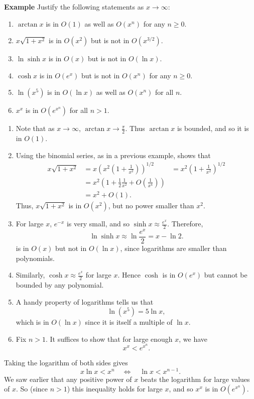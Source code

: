 \documentclass[twoside,openright,titlepage,a4paper]{book}
\begin{document}
\begin{sloppypar}
\textbf{Example} Justify the following statements as $x \rightarrow \infty$:
\begin{enumerate}
	\item $\arctan x$ is in $O(1)$ as well as $O(x^n)$ for any $n \geq 0$.
	\item $x \sqrt{1+x^2}$ is in $O(x^2)$ but is not in $O(x^{3/2})$.
	\item $\ln \sinh x$ is in $O(x)$ but is not in $O(\ln x)$.
	\item $\cosh x$ is in $O(e^x)$ but is not in $O(x^n)$ for any $n \geq 0$.
	\item $\ln (x^5)$ is in $O(\ln x)$ as well as $O(x^n)$ for all $n$.
	\item $x^x$ is in $O(e^{x^n})$ for all $n>1$.
\end{enumerate}
\begin{examplebox}
\begin{enumerate}
	\item Note that as $x \rightarrow \infty$, $\arctan x \rightarrow \frac{\pi}{2}$. Thus $\arctan x$ is bounded, and so it is in $O(1)$.
	\item Using the binomial series, as in a previous example, shows that
	\begin{align*}
	x \sqrt{1 + x^2} &= x \left(x^2\left(1+ \frac{1}{x^2}\right)\right)^{1/2} 
	&= x^2 \left(1+ \frac{1}{x^2}\right)^{1/2} \\
	&= x^2 \left( 1 + \frac{1}{2}\frac{1}{x^2} + O\left(\frac{1}{x^4}\right) \right) \\
	&= x^2 + O(1). 
	\end{align*}
	Thus, $x \sqrt{1+x^2}$ is in $O(x^2)$, but no power smaller than $x^2$.
	\item For large $x$, $e^{-x}$ is very small, and so $\sinh x \approx \frac{e^x}{2}$. Therefore, \[ \ln \sinh x \approx \ln \frac{e^x}{2} = x - \ln 2. \] is in $O(x)$ but not in $O(\ln x)$, since logarithms are smaller than polynomials.
	\item Similarly, $\cosh x \approx \frac{e^x}{2}$ for large $x$. Hence $\cosh$ is in $O(e^x)$ but cannot be bounded by any polynomial.
	\item A handy property of logarithms tells us that \[ \ln (x^5) = 5 \ln x, \] which is in $O(\ln x)$ since it is itself a multiple of $\ln x$.
	\item Fix $n>1$. It suffices to show that for large enough $x$, we have \[ x^x < e^{x^n}. \]
\end{enumerate}
Taking the logarithm of both sides gives \[ x \ln x < x^n \quad \Leftrightarrow \quad \ln x < x^{n-1}. \]
We saw earlier that any positive power of $x$ beats the logarithm for large values of $x$. So (since $n >1$) this inequality holds for large $x$, and so $x^x$ is in $O(e^{x^n})$.
\end{examplebox}


\end{sloppypar}
\end{document}
